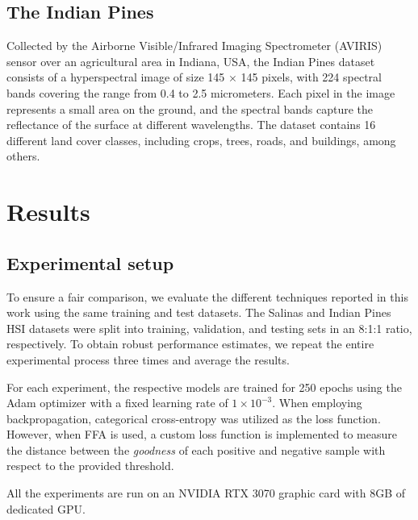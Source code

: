\documentclass{article}
\begin{document}
\subsection{The Indian Pines}
Collected by the Airborne Visible/Infrared Imaging Spectrometer (AVIRIS) sensor over an agricultural area in Indiana, USA, the Indian Pines dataset consists of a hyperspectral image of size 145 $\times$ 145 pixels, with 224 spectral bands covering the range from 0.4 to 2.5 micrometers. Each pixel in the image represents a small area on the ground, and the spectral bands capture the reflectance of the surface at different wavelengths. The dataset contains 16 different land cover classes, including crops, trees, roads, and buildings, among others. 

\section{Results}\label{sec: results}
\subsection{Experimental setup}

To ensure a fair comparison, we evaluate the different techniques reported in this work using the same training and test datasets. The Salinas and Indian Pines HSI datasets were split into training, validation, and testing sets in an 8:1:1 ratio, respectively. To obtain robust performance estimates, we repeat the entire experimental process three times and average the results.

For each experiment, the respective models are trained for 250 epochs using the Adam optimizer with a fixed learning rate of $1\times10^{-3}$. When employing backpropagation, categorical cross-entropy was utilized as the loss function. However, when FFA is used, a custom loss function is implemented to measure the distance between the \textit{goodness} of each positive and negative sample with respect to the provided threshold. %



All the experiments are run on an NVIDIA RTX 3070 graphic card with 8GB of dedicated GPU. 

\end{document}
